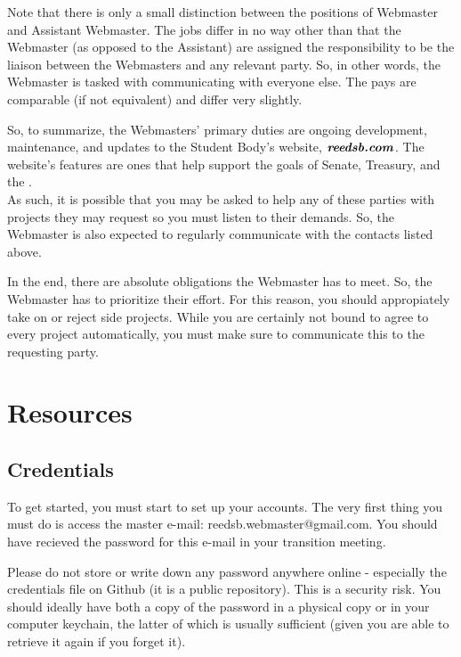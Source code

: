 \documentclass[a4paper]{article}
\begin{document}
\begin{note*}[Positions]
  Note that there is only a small distinction between the positions of Webmaster and Assistant Webmaster. The jobs differ in no way other than that the Webmaster (as opposed to the Assistant) are assigned the responsibility to be the liaison between the Webmasters and any relevant party. So, in other words, the Webmaster is tasked with communicating with everyone else. The pays are comparable (if not equivalent) and differ very slightly.
\end{note*}

\noindent So, to summarize, the Webmasters' primary duties are ongoing development, maintenance, and updates to the Student Body’s website, $\textbf{\textit{reedsb.com}}$. The website's features are ones that help support the goals of Senate, Treasury, and the \OSE. \\

\noindent As such, it is possible that you may be asked to help any of these parties with projects they may request so you must listen to their demands. So, the Webmaster is also expected to regularly communicate with the contacts listed above.

\begin{remark*}[Prioritize]
In the end, there are absolute obligations the Webmaster has to meet. So, the Webmaster has to prioritize their effort. For this reason, you should appropiately take on or reject side projects. While you are certainly not bound to agree to every project automatically, you must make sure to communicate this to the requesting party.
\end{remark*}

\newpage
\section{Resources}

\subsection{Credentials}

To get started, you must start to set up your accounts. The very first thing you must do is access the master e-mail: reedsb.webmaster@gmail.com. You should have recieved the password for this e-mail in your transition meeting.

\begin{warning*}
  Please do not store or write down any password anywhere online - especially the credentials file on Github (it is a public repository). This is a security risk. You should ideally have both a copy of the password in a physical copy or in your computer keychain, the latter of which is usually sufficient (given you are able to retrieve it again if you forget it).
\end{warning*}
\end{document}
